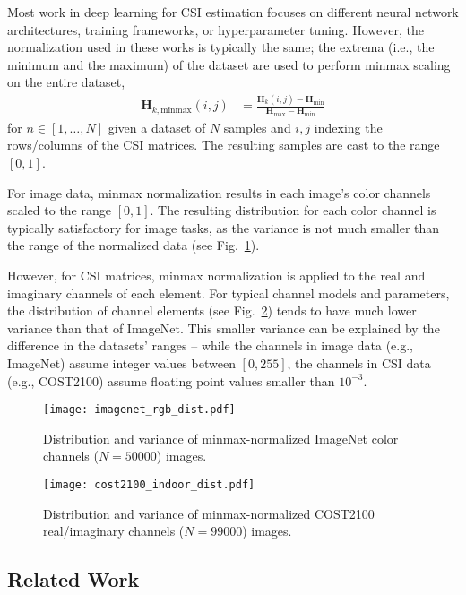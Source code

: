
Most work in deep learning for CSI estimation focuses on different neural network architectures, training frameworks, or hyperparameter tuning. However, the normalization used in these works is typically the same; the extrema (i.e., the minimum and the maximum) of the dataset are used to perform minmax scaling on the entire dataset, 
\begin{align*}
	\mathbf H_{k,\text{minmax}}(i,j) &= \frac{\mathbf H_k(i,j)-\mathbf H_{\text{min}}}{\mathbf H_{\text{max}}-\mathbf H_{\text{min}}}
\end{align*}
for $n \in [1,\dots,N]$ given a dataset of $N$ samples and $i,j$ indexing the rows/columns of the CSI matrices. The resulting samples are cast to the range $[0,1]$.

For image data, minmax normalization results in each image's color channels scaled to the range $[0,1]$. The resulting distribution for each color channel is typically satisfactory for image tasks, as the variance is not much smaller than the range of the normalized data (see Fig.~\ref{fig:imagenet_dist}).

However, for CSI matrices, minmax normalization is applied to the real and imaginary channels of each element. For typical channel models and parameters, the distribution of channel elements (see Fig.~\ref{fig:cost_indoor_dist}) tends to have much lower variance than that of ImageNet. This smaller variance can be explained by the difference in the datasets' ranges -- while the channels in image data (e.g., ImageNet) assume integer values between $[0,255]$, the channels in CSI data (e.g., COST2100) assume floating point values smaller than $10^{-3}$.

\begin{figure}[htb]
	\centering
	\texttt{[image: imagenet\_rgb\_dist.pdf]}
	\medskip
	\caption{Distribution and variance of minmax-normalized ImageNet color channels ($N=50000$) images.}
	\label{fig:imagenet_dist}
\end{figure}

\begin{figure}[htb]
	\centering
	\texttt{[image: cost2100\_indoor\_dist.pdf]}
	\medskip
	\caption{Distribution and variance of minmax-normalized COST2100 real/imaginary channels ($N=99000$) images.}
	\label{fig:cost_indoor_dist}
\end{figure}

\blindtext

\subsection{Related Work}

